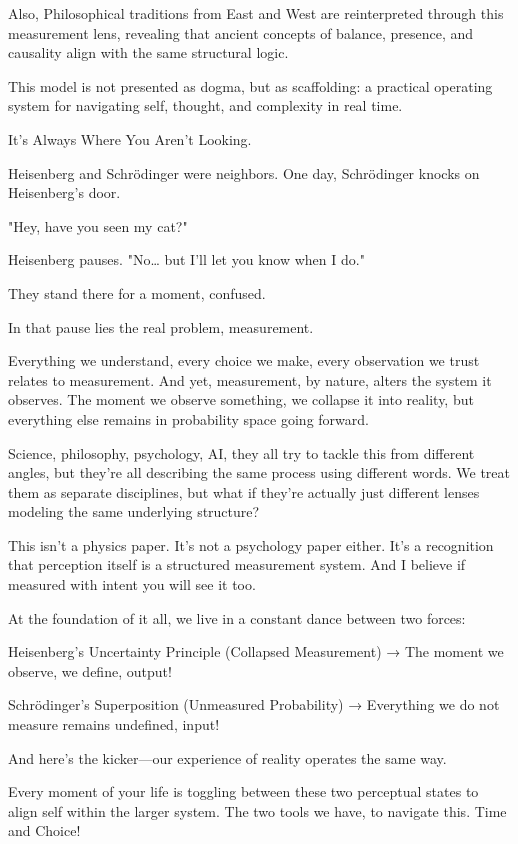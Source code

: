 \documentclass[11pt]{article}
\begin{document}
Also, Philosophical traditions from East and West are reinterpreted through this measurement lens, revealing that ancient concepts of balance, presence, and causality align with the same structural logic.

This model is not presented as dogma, but as scaffolding: a practical operating system for navigating self, thought, and complexity in real time.

It’s Always Where You Aren’t Looking.

Heisenberg and Schrödinger were neighbors. One day, Schrödinger knocks on Heisenberg’s door.

"Hey, have you seen my cat?"

Heisenberg pauses. "No… but I’ll let you know when I do."

They stand there for a moment, confused. 

In that pause lies the real problem, measurement. 

Everything we understand, every choice we make, every observation we trust relates to measurement. And yet, measurement, by nature, alters the system it observes. The moment we observe something, we collapse it into reality, but everything else remains in probability space going forward. 

Science, philosophy, psychology, AI, they all try to tackle this from different angles, but they’re all describing the same process using different words. We treat them as separate disciplines, but what if they’re actually just different lenses modeling the same underlying structure?

This isn’t a physics paper. It’s not a psychology paper either. It’s a recognition that perception itself is a structured measurement system. And I believe if measured with intent you will see it too. 

At the foundation of it all, we live in a constant dance between two forces:

Heisenberg’s Uncertainty Principle (Collapsed Measurement) → The moment we observe, we define, output!

Schrödinger’s Superposition (Unmeasured Probability) → Everything we do not measure remains undefined, input!

And here’s the kicker—our experience of reality operates the same way.

Every moment of your life is toggling between these two perceptual states to align self within the larger system. The two tools we have, to navigate this. Time and Choice!
\end{document}
